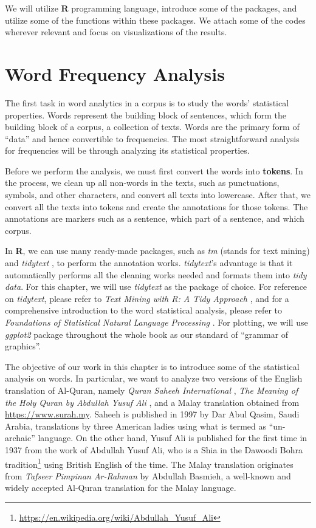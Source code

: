 \documentclass[
]{article}
\begin{document}
We will utilize \textbf{R} programming language, introduce some of the packages, and utilize some of the functions within these packages. We attach some of the codes wherever relevant and focus on visualizations of the results.

\hypertarget{word-frequency-analysis}{%
\section{Word Frequency Analysis}\label{word-frequency-analysis}}

The first task in word analytics in a corpus is to study the words' statistical properties. Words represent the building block of sentences, which form the building block of a corpus, a collection of texts. Words are the primary form of ``data'' and hence convertible to frequencies. The most straightforward analysis for frequencies will be through analyzing its statistical properties.

Before we perform the analysis, we must first convert the words into \textbf{tokens}. In the process, we clean up all non-words in the texts, such as punctuations, symbols, and other characters, and convert all texts into lowercase. After that, we convert all the texts into tokens and create the annotations for those tokens. The annotations are markers such as a sentence, which part of a sentence, and which corpus.

In \textbf{R}, we can use many ready-made packages, such as \emph{tm} \citep{tm} (stands for text mining) and \emph{tidytext} \citep{tidytext}, to perform the annotation works. \emph{tidytext}'s advantage is that it automatically performs all the cleaning works needed and formats them into \emph{tidy data}. For this chapter, we will use \emph{tidytext} as the package of choice. For reference on \emph{tidytext}, please refer to \emph{Text Mining with R: A Tidy Approach} \citep{silge2017}, and for a comprehensive introduction to the word statistical analysis, please refer to \emph{Foundations of Statistical Natural Language Processing} \citep{manning1999}. For plotting, we will use \emph{ggplot2} \citep{ggplot2} package throughout the whole book as our standard of ``grammar of graphics''.

The objective of our work in this chapter is to introduce some of the statistical analysis on words. In particular, we want to analyze two versions of the English translation of Al-Quran, namely \emph{Quran Saheeh International} \citep{saheeh1997}, \emph{The Meaning of the Holy Quran by Abdullah Yusuf Ali} \citep{yusufali2003}, and a Malay translation obtained from \url{https://www.surah.my}. Saheeh is published in 1997 by Dar Abul Qasim, Saudi Arabia, translations by three American ladies using what is termed as ``un-archaic'' language. On the other hand, Yusuf Ali is published for the first time in 1937 from the work of Abdullah Yusuf Ali, who is a Shia in the Dawoodi Bohra tradition\footnote{\url{https://en.wikipedia.org/wiki/Abdullah_Yusuf_Ali}} using British English of the time. The Malay translation originates from \emph{Tafseer Pimpinan Ar-Rahman} by Abdullah Basmieh, a well-known and widely accepted Al-Quran translation for the Malay language.
\end{document}
